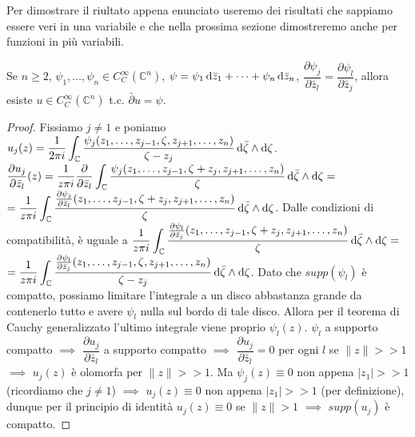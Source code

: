Per dimostrare il riultato appena enunciato useremo dei risultati che sappiamo essere veri in una variabile e che nella prossima sezione dimostreremo anche per funzioni in più variabili.

\begin{thm} \label{equazionaccia}
  Se $n \ge 2$, $\psi_1, \dots, \psi_n \in C^\infty_C(\mathbb{C}^n)$, $\psi=\psi_1\mathop{}\!\mathrm{d} \bar{z}_1+\dots+\psi_n\mathop{}\!\mathrm{d} \bar{z}_n$, $\dfrac{\partial \psi_j}{\partial \bar{z}_l}=\dfrac{\partial \psi_l}{\partial \bar{z}_j}$, allora esiste $u \in C^{\infty}_C(\mathbb{C}^n)$ t.c. $\bar{\partial}u=\psi$.
\end{thm}

\begin{proof}
  Fissiamo $j\not=1$ e poniamo $\displaystyle u_j(z)=\frac{1}{2\pi i}\int_{\mathbb{C}} \dfrac{\psi_j(z_1, \dots, z_{j-1}, \zeta, z_{j+1}, \dots, z_n)}{\zeta-z_j}\mathop{}\!\mathrm{d}\bar{\zeta}\wedge\mathop{}\!\mathrm{d}\zeta$.
  $\displaystyle \frac{\partial u_j}{\partial \bar{z}_l}(z)=\frac{1}{z\pi i}\frac{\partial}{\partial\bar{z}_l}\int_{\mathbb{C}} \dfrac{\psi_j(z_1, \dots, z_{j-1}, \zeta+z_j, z_{j+1}, \dots, z_n)}{\zeta}\mathop{}\!\mathrm{d}\bar{\zeta}\wedge\mathop{}\!\mathrm{d}\zeta=$\\
  $\displaystyle =\frac{1}{z\pi i}\int_{\mathbb{C}} \dfrac{\frac{\partial\psi_j}{\partial\bar{z}_l}(z_1, \dots, z_{j-1}, \zeta+z_j, z_{j+1}, \dots, z_n)}{\zeta}\mathop{}\!\mathrm{d}\bar{\zeta}\wedge\mathop{}\!\mathrm{d}\zeta$.
  Dalle condizioni di compatibilità, è uguale a $\displaystyle \frac{1}{z\pi i}\int_{\mathbb{C}} \dfrac{\frac{\partial\psi_l}{\partial\bar{z}_j}(z_1, \dots, z_{j-1}, \zeta+z_j, z_{j+1}, \dots, z_n)}{\zeta}\mathop{}\!\mathrm{d}\bar{\zeta}\wedge\mathop{}\!\mathrm{d}\zeta=$ \\
  $\displaystyle =\frac{1}{z\pi i}\int_{\mathbb{C}} \dfrac{\frac{\partial\psi_l}{\partial\bar{z}_j}(z_1, \dots, z_{j-1}, \zeta, z_{j+1}, \dots, z_n)}{\zeta-z_j}\mathop{}\!\mathrm{d}\bar{\zeta}\wedge\mathop{}\!\mathrm{d}\zeta$.
  Dato che $supp(\psi_l)$ è compatto, possiamo limitare l'integrale a un disco abbastanza grande da contenerlo tutto e avere $\psi_l$ nulla sul bordo di tale disco. Allora per il teorema di Cauchy generalizzato l'ultimo integrale viene proprio $\psi_l(z)$. $\psi_l$ a supporto compatto $\implies$ $\dfrac{\partial u_j}{\partial \bar{z}_l}$ a supporto compatto $\implies$ $\dfrac{\partial u_j}{\partial \bar{z}_l}=0$ per ogni $l$ se $\|z\|>>1$ $\implies$ $u_j(z)$ è olomorfa per $\|z\|>>1$.
  Ma $\psi_j(z)\equiv 0$ non appena $|z_1|>>1$ (ricordiamo che $j\not=1$) $\implies$ $u_j(z) \equiv 0$ non appena $|z_1|>>1$ (per definizione), dunque per il principio di identità $u_j(z) \equiv 0$ se $\|z\|>1$ $\implies$ $supp(u_j)$ è compatto.
\end{proof}

